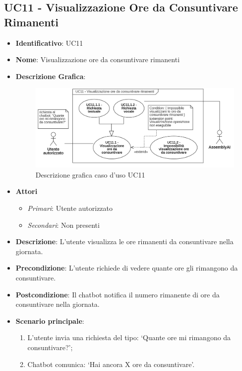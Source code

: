 \subsection{UC11 - Visualizzazione Ore da Consuntivare Rimanenti }
\begin{itemize}
	\item \textbf{Identificativo}: UC11
	\item \textbf{Nome}: Visualizzazione ore da consuntivare rimanenti
	\item \textbf{Descrizione Grafica}:
	\begin{figure}[h]
		\centering
		\includegraphics[scale=0.55]{images/UC11.png} 
		\caption{Descrizione grafica caso d'uso UC11}
	 \end{figure}

	\item \textbf{Attori}
	\begin{itemize} 
		\item \textit{Primari}: Utente autorizzato
		\item \textit{Secondari}: Non presenti
	\end{itemize}
	\item \textbf{Descrizione}: L'utente visualizza le ore rimanenti da consuntivare nella giornata.
	\item \textbf{Precondizione}: L'utente richiede di vedere quante ore gli rimangono da consuntivare.
	\item \textbf{Postcondizione}: Il chatbot notifica il numero rimanente di ore da consuntivare nella giornata.
	\item \textbf{Scenario principale}: \begin{enumerate}
		\item L'utente invia una richiesta del tipo: `Quante ore mi rimangono da consuntivare?';
		\item Chatbot comunica: `Hai ancora X ore da consuntivare'.
	\end{enumerate}
\end{itemize}

